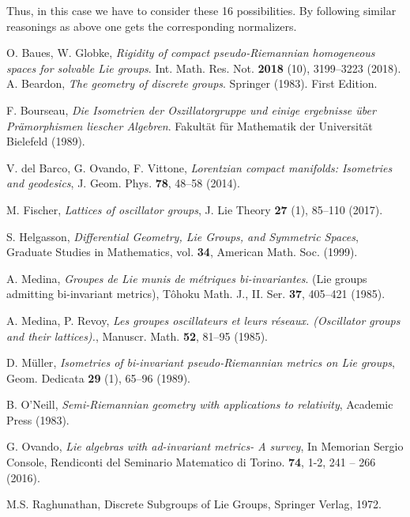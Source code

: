 \documentclass[11pt]{amsart}
\theoremstyle{plain}
\theoremstyle{definition}
\theoremstyle{remark}
\begin{document}
  Thus, in this case we have to consider these 16 possibilities. By following  similar reasonings as above one gets the corresponding normalizers. 
  
  
    
	\begin{thebibliography}{GGGG}
		
		 {\sc O. Baues, W. Globke}, {\it Rigidity of compact pseudo-Riemannian homogeneous spaces for solvable Lie groups}. 
			Int. Math. Res. Not. {\bf  2018} (10), 3199--3223 (2018). 
		 {\sc A. Beardon}, {\it The geometry of discrete groups}. Springer (1983). First Edition. 
		
		 {\sc F. Bourseau}, {\it Die Isometrien der Oszillatorgruppe und einige ergebnisse \"uber Pr\"amorphismen liescher Algebren}. Fakult\"at f\"ur Mathematik der Universit\"at Bielefeld (1989).
		
			 {\sc V. del Barco, \sc G. Ovando, \sc F. Vittone}, {\it Lorentzian compact manifolds: Isometries and geodesics}, J. Geom. Phys. {\bf 78}, 48--58 (2014).
		
		
			 {\sc M. Fischer}, {\it Lattices of oscillator groups}, J. Lie Theory {\bf 27} (1), 85--110 (2017). 	
			
			 {\sc S. Helgasson}, {\it Differential Geometry, Lie Groups, and Symmetric Spaces}, Graduate Studies in Mathematics, vol. {\bf 34}, American Math. Soc. (1999).
			
		 {\sc A. Medina}, {\it Groupes de Lie munis de m\'etriques bi-invariantes}. (Lie groups admitting bi-invariant metrics), T\^ohoku Math. J., II. Ser. {\bf 37}, 405--421 (1985). 
		
		
	 {\sc A. Medina,  P. Revoy}, {\it Les groupes oscillateurs et leurs r\'eseaux. (Oscillator groups and their lattices).}, Manuscr. Math. {\bf 52}, 81--95 (1985). 
	
	
	
	
	 {\sc D. M\"uller}, {\it Isometries of bi-invariant pseudo-Riemannian metrics on Lie groups},  Geom. Dedicata {\bf 29} (1),  65--96 (1989).
	
		
		
		 {\sc B. O'Neill}, {\it Semi-Riemannian geometry with
			applications to relativity}, Academic Press (1983).
		
		

		
		 {\sc G. Ovando}, {\it Lie algebras with ad-invariant metrics- A survey}, In Memorian Sergio Console, Rendiconti del Seminario Matematico di Torino. {\bf  74}, 1-2, 241 -- 266 (2016).
		
		 {\sc  M.S. Raghunathan}, Discrete Subgroups of Lie Groups, Springer Verlag, 1972.
		
		
		
	\end{thebibliography}
	
	\appendix 
	
	
	
\end{document}

